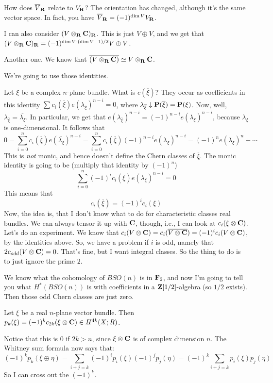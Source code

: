 How does $\overline{V}_\mathbf R$ relate to $V_\mathbf R$?
The orientation has changed, although it's the same vector space.
In fact, you have $\overline{V}_\mathbf R = (-1)^{\dim V} V_\mathbf R$.

I can also consider $(V\otimes_\mathbf R\mathbf C)_\mathbf R$.
This is just $V\oplus V$, and we get that $(V\otimes_\mathbf R\mathbf C)_\mathbf R = (-1)^{\dim V\cdot(\dim V - 1)/2} V\oplus V$.

Another one.
We know that $\overline{(V\otimes_\mathbf R\mathbf C)}\simeq V\otimes_\mathbf R\mathbf C$.

We're going to use those identities.

Let $\xi$ be a complex $n$-plane bundle.
What is $c(\overline{\xi})$?
They occur as coefficients in this identity $\sum c_i(\overline{\xi}) e(\lambda_{\overline{\xi}})^{n-i} = 0$, where $\lambda_{\overline{\xi}}\downarrow \mathbf P(\overline{\xi}) = \mathbf P(\xi)$.
Now, well, $\lambda_{\overline{\xi}} = \overline{\lambda_\xi}$.
In particular, we get that $e(\lambda_{\overline{\xi}})^{n-i} = (-1)^{n-i}e(\lambda_\xi)^{n-i}$, because $\lambda_\xi$ is one-dimensional.
It follows that
$$
0 = \sum^n_{i=0}c_i(\overline{\xi})e(\overline{\lambda_\xi})^{n-i} = \sum^n_{i=0}c_i(\overline{\xi}) (-1)^{n-i}e(\lambda_\xi)^{n-i} = (-1)^n e(\lambda_\xi)^n + \cdots
$$
This is \emph{not} monic, and hence doesn't define the Chern classes of $\overline{\xi}$.
The monic identity is going to be (multiply that identity by $(-1)^n$)
$$
\sum^n_{i=0}(-1)^ic_i(\overline{\xi})e(\lambda_\xi)^{n-i} = 0
$$
This means that
$$
\boxed{c_i(\overline{\xi}) = (-1)^ic_i(\xi)}
$$
Now, the idea is, that I don't know what to do for characteristic classes real bundles.
We can always tensor it up with $\mathbf C$, though, i.e., I can look at $c_i(\xi\otimes\mathbf C)$.
Let's do an experiment.
We know that $c_i(V\otimes\mathbf C) = c_i(\overline{V\otimes\mathbf C}) = (-1)^ic_i(V\otimes\mathbf C)$, by the identities above.
So, we have a problem if $i$ is odd, namely that $2c_{odd}(V\otimes\mathbf C) = 0$.
That's fine, but I want integral classes.
So the thing to do is to just ignore the prime $2$.

We know what the cohomology of $BSO(n)$ is in $\mathbf F_2$, and now I'm going to tell you what $H^\ast(BSO(n))$ is with coefficients in a $\mathbf Z[1/2]$-algebra (so $1/2$ exists).
Then those odd Chern classes are just zero.
\begin{definition}
    Let $\xi$ be a real $n$-plane vector bundle.
    Then $p_k(\xi) = (-1)^kc_{2k}(\xi\otimes\mathbf C)\in H^{4k}(X;R)$.
\end{definition}
Notice that this is $0$ if $2k>n$, since $\xi\otimes\mathbf C$ is of complex dimension $n$.
The Whitney sum formula now says that:
$$
(-1)^k p_k(\xi\oplus\eta) = \sum_{i+j = k}(-1)^i p_i(\xi) (-1)^j p_j(\eta) = (-1)^k\sum_{i+j=k}p_i(\xi)p_j(\eta)
$$
So I can cross out the $(-1)^k$.

